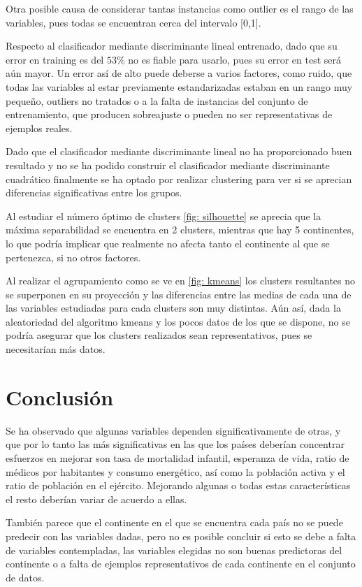 \documentclass[twoside,openright,titlepage,numbers=noenddot,openany,headinclude,footinclude=true,
cleardoublepage=empty,abstractoff,BCOR=5mm,paper=a4,fontsize=12pt,main=spanish]{scrreprt}
\begin{document}
Otra posible causa de considerar tantas instancias como outlier es el rango de las variables, pues todas se encuentran cerca del intervalo [0,1].

Respecto al clasificador mediante discriminante lineal entrenado, dado que su error en training es del $53\%$ no es fiable para usarlo, pues su error en test será aún mayor. Un error así de alto puede deberse a varios factores, como ruido, que todas las variables al estar previamente estandarizadas estaban en un rango muy pequeño, outliers no tratados o a la falta de instancias del conjunto de entrenamiento, que producen sobreajuste o pueden no ser representativas de ejemplos reales.

Dado que el clasificador mediante discriminante lineal no ha proporcionado buen resultado y no se ha podido construir el clasificador mediante discriminante cuadrático finalmente se ha optado por realizar clustering para ver si se aprecian diferencias significativas entre los grupos.

Al estudiar el número óptimo de clusters \eqref{fig: silhouette} se aprecia que la máxima separabilidad se encuentra en 2 clusters, mientras que hay 5 continentes, lo que podría implicar que realmente no afecta tanto el continente al que se pertenezca, si no otros factores.

Al realizar el agrupamiento como se ve en \eqref{fig: kmeans} los clusters resultantes no se superponen en su proyección y las diferencias entre las medias de cada una de las variables estudiadas para cada clusters son muy distintas. Aún así, dada la aleatoriedad del algoritmo kmeans y los pocos datos de los que se dispone, no se podría asegurar que los clusters realizados sean representativos, pues se necesitarían más datos. 

\section{Conclusión}

Se ha observado que algunas variables dependen significativamente de otras, y que por lo tanto las más significativas en las que los países deberían concentrar esfuerzos en mejorar son tasa de mortalidad infantil, esperanza de vida, ratio de médicos por habitantes y consumo energético, así como la población activa y el ratio de población en el ejército. Mejorando algunas o todas estas características el resto deberían variar de acuerdo a ellas.

También parece que el continente en el que se encuentra cada país no se puede predecir con las variables dadas, pero no es posible concluir si esto se debe a falta de variables contempladas, las variables elegidas no son buenas predictoras del continente o a falta de ejemplos representativos de cada continente en el conjunto de datos.
\end{document}
